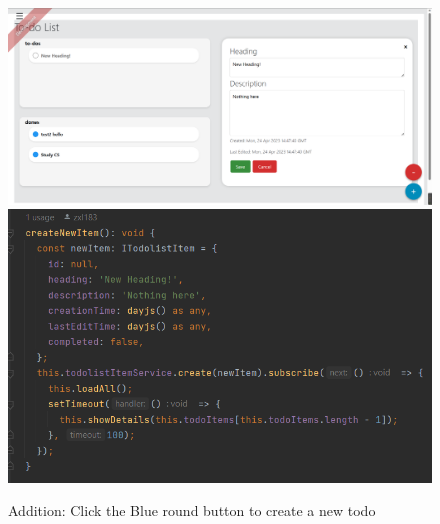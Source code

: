 \documentclass[a4paper]{article}
\begin{document}
\begin{minipage}{\textwidth}
\begin{figure}[H]
  \begin{minipage}{0.59\textwidth}
    \centering
    \includegraphics[width=\linewidth]{./images/Interface_Addition.png} 
  \end{minipage}\hfill
  \begin{minipage}{0.41\textwidth}
    \centering
    \includegraphics[width=\linewidth]{./images/Backend_Addition.png}
  \end{minipage}
  Addition: Click the Blue round button to create a new todo
  

\end{figure}
\end{minipage}
\end{document}
